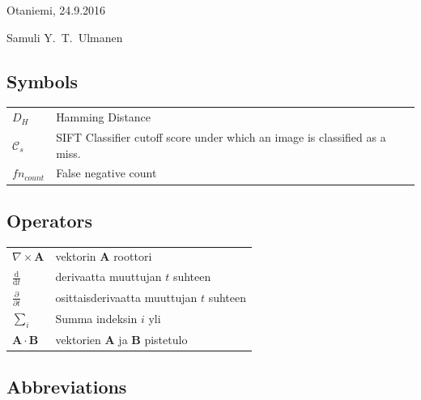 \documentclass[english,12pt,a4paper,pdftex,elec,utf8]{aaltothesis}
\begin{document}
\vspace{5cm}
Otaniemi, 24.9.2016

\vspace{5mm}
{\hfill Samuli Y.\ T.\ Ulmanen \hspace{1cm}}

\newpage


\thesistableofcontents


\subsection*{Symbols}

\begin{tabular}{ll}
$D_H$ & Hamming Distance\\
$\mathcal{C}_s$ & SIFT Classifier cutoff score under which an image is classified as a miss.\\
$fn_{count}$ & False negative count\\
\end{tabular}

\subsection*{Operators}

\begin{tabular}{ll}
$\nabla \times \mathbf{A}$              & vektorin $\mathbf{A}$ roottori\\
$\displaystyle\frac{\mbox{d}}{\mbox{d} t}$ & derivaatta muuttujan $t$ suhteen\\
[3mm]
$\displaystyle\frac{\partial}{\partial t}$  & osittaisderivaatta muuttujan $t$ suhteen \\[3mm]
$\sum_i $                       & Summa indeksin $i$ yli\\
$\mathbf{A} \cdot \mathbf{B}$    & vektorien $\mathbf{A}$ ja $\mathbf{B}$ pistetulo
\end{tabular}

\subsection*{Abbreviations}
\end{document}
